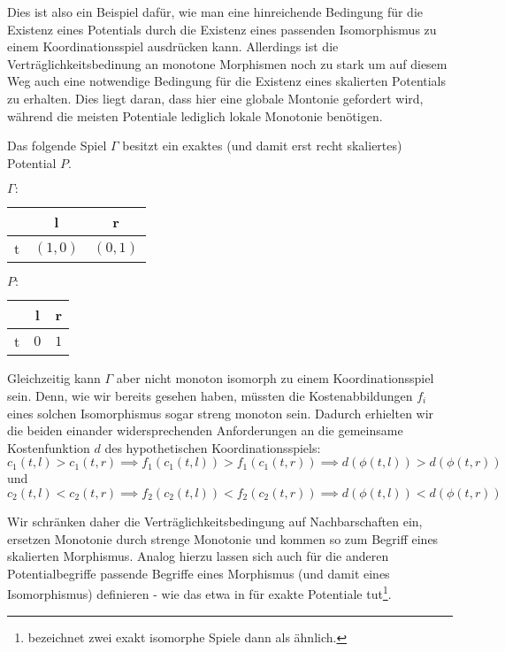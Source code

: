 Dies ist also ein Beispiel dafür, wie man eine hinreichende Bedingung für die Existenz eines Potentials durch die Existenz eines passenden Isomorphismus zu einem Koordinationsspiel ausdrücken kann. Allerdings ist die Verträglichkeitsbedinung an monotone Morphismen noch zu stark um auf diesem Weg auch eine notwendige Bedingung für die Existenz eines skalierten Potentials zu erhalten. Dies liegt daran, dass hier eine globale Montonie gefordert wird, während die meisten Potentiale lediglich lokale Monotonie benötigen.

\begin{bsp}
	Das folgende Spiel $\Gamma$ besitzt ein exaktes (und damit erst recht skaliertes) Potential $P$.
	\begin{center}
		$\Gamma:$ \quad
		\begin{tabular}{c||c|c}
				& l 		& r 		\\\hline\hline
			t	& $(1,0)$	& $(0,1)$	
		\end{tabular}\hspace{5em}
		$P:$ \quad
		\begin{tabular}{c||c|c}
				& l 		& r 		\\\hline\hline
			t	& $0$		& $1$		
		\end{tabular}
	\end{center}
	Gleichzeitig kann $\Gamma$ aber nicht monoton isomorph zu einem Koordinationsspiel sein. Denn, wie wir bereits gesehen haben, müssten die Kostenabbildungen $f_i$ eines solchen Isomorphismus sogar streng monoton sein. Dadurch erhielten wir die beiden einander widersprechenden Anforderungen an die gemeinsame Kostenfunktion $d$ des hypothetischen Koordinationsspiels:
		\[c_1(t,l) > c_1(t,r) \implies f_1(c_1(t,l)) > f_1(c_1(t,r)) \implies d(\phi(t,l)) > d(\phi(t,r)) \]
	und 
		\[c_2(t,l) < c_2(t,r) \implies f_2(c_2(t,l)) < f_2(c_2(t,r)) \implies d(\phi(t,l)) < d(\phi(t,r)) \]
\end{bsp}

Wir schränken daher die Verträglichkeitsbedingung auf Nachbarschaften ein, ersetzen Monotonie durch strenge Monotonie und kommen so zum Begriff eines skalierten Morphismus. Analog hierzu lassen sich auch für die anderen Potentialbegriffe passende Begriffe eines Morphismus (und damit eines Isomorphismus) definieren - wie das etwa \citeauthor{ReprOfFiniteGamesAsNCG} in \cite[Abschnitt 2.1]{ReprOfFiniteGamesAsNCG} für exakte Potentiale tut\footnote{\citeauthor{ReprOfFiniteGamesAsNCG} bezeichnet zwei exakt isomorphe Spiele dann als \glqq ähnlich\grqq.}.

